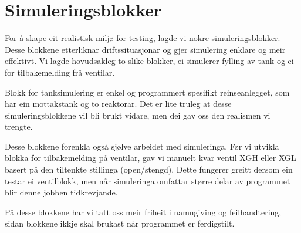 \section{Simuleringsblokker}
\thispagestyle{fancy}

For å skape eit realistisk miljø for testing, lagde vi nokre simuleringsblokker.
Desse blokkene etterliknar driftssituasjonar og gjer simulering enklare og meir effektivt.
Vi lagde hovudsakleg to slike blokker, ei simulerer fylling av tank
og ei for tilbakemelding frå ventilar.

Blokk for tanksimulering er enkel og programmert spesifikt reinseanlegget, 
som har ein mottakstank og to reaktorar.
Det er lite truleg at desse simuleringsblokkene vil bli brukt vidare, men dei gav
oss den realismen vi trengte.

Desse blokkene forenkla også sjølve arbeidet med simuleringa.
Før vi utvikla blokka for tilbakemelding på ventilar, 
gav vi manuelt kvar ventil \gls{XGH} eller \gls{XGL} basert på den tiltenkte stillinga (open/stengd). \newline
Dette fungerer greitt dersom ein testar ei ventilblokk, men
når simuleringa omfattar større delar av programmet blir denne jobben tidkrevjande.

På desse blokkene har vi tatt oss meir friheit i namngiving og feilhandtering, sidan blokkene ikkje skal brukast når programmet er ferdigstilt.


